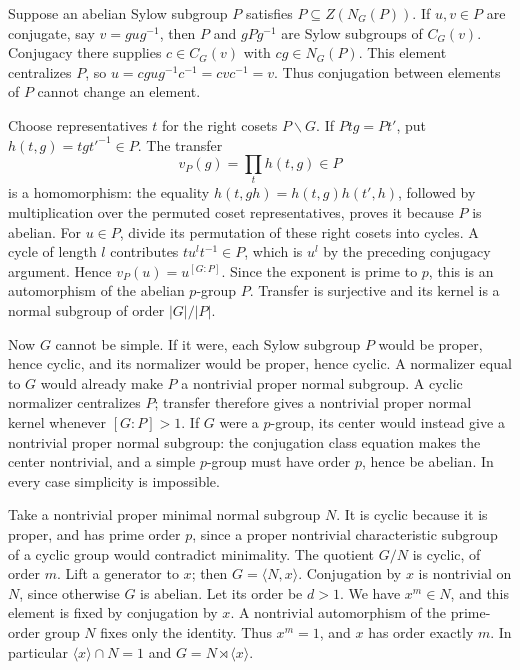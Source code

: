 \documentclass[
]{article}
\begin{document}
Suppose an abelian Sylow subgroup \(P\) satisfies
\(P\subseteq Z(N_G(P))\). If \(u,v\in P\) are conjugate, say
\(v=gug^{-1}\), then \(P\) and \(gPg^{-1}\) are Sylow subgroups of
\(C_G(v)\). Conjugacy there supplies \(c\in C_G(v)\) with
\(cg\in N_G(P)\). This element centralizes \(P\), so
\(u=cgug^{-1}c^{-1}=cvc^{-1}=v\). Thus conjugation between elements of
\(P\) cannot change an element.

Choose representatives \(t\) for the right cosets \(P\backslash G\). If
\(Ptg=Pt'\), put \(h(t,g)=tgt'^{-1}\in P\). The transfer \[
v_P(g)=\prod_t h(t,g)\in P
\] is a homomorphism: the equality \(h(t,gh)=h(t,g)h(t',h)\), followed
by multiplication over the permuted coset representatives, proves it
because \(P\) is abelian. For \(u\in P\), divide its permutation of
these right cosets into cycles. A cycle of length \(l\) contributes
\(tu^lt^{-1}\in P\), which is \(u^l\) by the preceding conjugacy
argument. Hence \(v_P(u)=u^{[G:P]}\). Since the exponent is prime to
\(p\), this is an automorphism of the abelian \(p\)-group \(P\).
Transfer is surjective and its kernel is a normal subgroup of order
\(|G|/|P|\).

Now \(G\) cannot be simple. If it were, each Sylow subgroup \(P\) would
be proper, hence cyclic, and its normalizer would be proper, hence
cyclic. A normalizer equal to \(G\) would already make \(P\) a
nontrivial proper normal subgroup. A cyclic normalizer centralizes
\(P\); transfer therefore gives a nontrivial proper normal kernel
whenever \([G:P]>1\). If \(G\) were a \(p\)-group, its center would
instead give a nontrivial proper normal subgroup: the conjugation class
equation makes the center nontrivial, and a simple \(p\)-group must have
order \(p\), hence be abelian. In every case simplicity is impossible.

Take a nontrivial proper minimal normal subgroup \(N\). It is cyclic
because it is proper, and has prime order \(p\), since a proper
nontrivial characteristic subgroup of a cyclic group would contradict
minimality. The quotient \(G/N\) is cyclic, of order \(m\). Lift a
generator to \(x\); then \(G=\langle N,x\rangle\). Conjugation by \(x\)
is nontrivial on \(N\), since otherwise \(G\) is abelian. Let its order
be \(d>1\). We have \(x^m\in N\), and this element is fixed by
conjugation by \(x\). A nontrivial automorphism of the prime-order group
\(N\) fixes only the identity. Thus \(x^m=1\), and \(x\) has order
exactly \(m\). In particular \(\langle x\rangle\cap N=1\) and
\(G=N\rtimes\langle x\rangle\).
\end{document}
